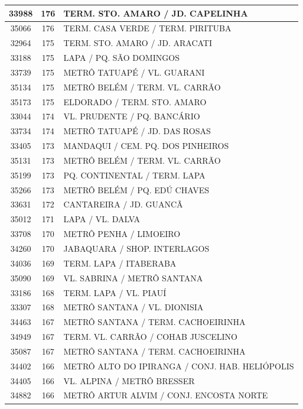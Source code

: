 \documentclass[
	12pt,				%
	oneside,			%
	a4paper,			%
	english,			%
	brazil				%
	]{abntex2ppgsi}
\begin{document}
{{\begin{apendicesenv}
\begin{longtable}{c|c|p{7cm}}
33988 &	176 &	TERM. STO. AMARO / JD. CAPELINHA \\ 
 \hline 
35066 &	176 &	TERM. CASA VERDE / TERM. PIRITUBA \\ 
 \hline 
32964 &	175 &	TERM. STO. AMARO / JD. ARACATI \\ 
 \hline 
33188 &	175 &	LAPA / PQ. SÃO DOMINGOS \\ 
 \hline 
33739 &	175 &	METRÔ TATUAPÉ / VL. GUARANI \\ 
 \hline 
35134 &	175 &	METRÔ BELÉM / TERM. VL. CARRÃO \\ 
 \hline 
35173 &	175 &	ELDORADO / TERM. STO. AMARO \\ 
 \hline 
33044 &	174 &	VL. PRUDENTE / PQ. BANCÁRIO \\ 
 \hline 
33734 &	174 &	METRÔ TATUAPÉ / JD. DAS ROSAS \\ 
 \hline 
33405 &	173 &	MANDAQUI / CEM. PQ. DOS PINHEIROS \\ 
 \hline 
35131 &	173 &	METRÔ BELÉM / TERM. VL. CARRÃO \\ 
 \hline 
35199 &	173 &	PQ. CONTINENTAL / TERM. LAPA \\ 
 \hline 
35266 &	173 &	METRÔ BELÉM / PQ. EDÚ CHAVES \\ 
 \hline 
33631 &	172 &	CANTAREIRA / JD. GUANCÃ \\ 
 \hline 
35012 &	171 &	LAPA / VL. DALVA \\ 
 \hline 
33708 &	170 &	METRÔ PENHA / LIMOEIRO \\ 
 \hline 
34260 &	170 &	JABAQUARA / SHOP. INTERLAGOS \\ 
 \hline 
34036 &	169 &	TERM. LAPA / ITABERABA \\ 
 \hline 
35090 &	169 &	VL. SABRINA / METRÔ SANTANA \\ 
 \hline 
33186 &	168 &	TERM. LAPA / VL. PIAUÍ \\ 
 \hline 
33307 &	168 &	METRÔ SANTANA / VL. DIONISIA \\ 
 \hline 
34463 &	167 &	METRÔ SANTANA / TERM. CACHOEIRINHA \\ 
 \hline 
34949 &	167 &	TERM. VL. CARRÃO / COHAB JUSCELINO \\ 
 \hline 
35087 &	167 &	METRÔ SANTANA / TERM. CACHOEIRINHA \\ 
 \hline 
34402 &	166 &	METRÔ ALTO DO IPIRANGA / CONJ. HAB. HELIÓPOLIS \\ 
 \hline 
34405 &	166 &	VL. ALPINA / METRÔ BRESSER \\ 
 \hline 
34882 &	166 &	METRÔ ARTUR ALVIM / CONJ. ENCOSTA NORTE \\ 

\end{longtable}
\end{apendicesenv}}}
\end{document}
